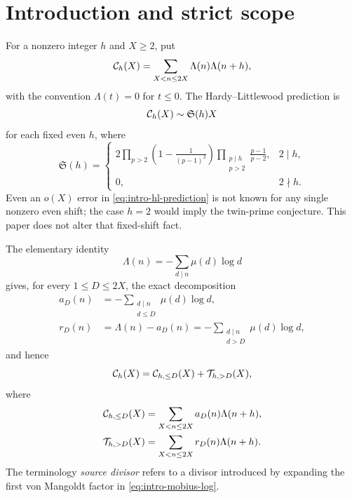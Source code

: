 \section{Introduction and strict scope}
\label{sec:introduction-scope}

For a nonzero integer $h$ and $X\ge2$, put
\begin{equation}\label{eq:intro-pair-correlation}
 \mathcal C_h(X)=\sum_{X<n\le2X}\Lambda(n)\Lambda(n+h),
\end{equation}
with the convention $\Lambda(t)=0$ for $t\le0$.  The Hardy--Littlewood
prediction is
\begin{equation}\label{eq:intro-hl-prediction}
 \mathcal C_h(X)\sim\mathfrak S(h)X
\end{equation}
for each fixed even $h$, where
\begin{equation}\label{eq:intro-singular-series}
 \mathfrak S(h)=
 \begin{cases}
 \displaystyle
 2\prod_{p>2}\left(1-\frac1{(p-1)^2}\right)
 \prod_{\substack{p\mid h\\p>2}}\frac{p-1}{p-2},&2\mid h,\\[1.3ex]
 0,&2\nmid h.
 \end{cases}
\end{equation}
Even an $o(X)$ error in \eqref{eq:intro-hl-prediction} is not known for any
single nonzero even shift; the case $h=2$ would imply the twin-prime
conjecture.  This paper does not alter that fixed-shift fact.

The elementary identity
\begin{equation}\label{eq:intro-mobius-log}
 \Lambda(n)=-\sum_{d\mid n}\mu(d)\log d
\end{equation}
gives, for every $1\le D\le2X$, the exact decomposition
\begin{align}
 a_D(n)&=-\sum_{\substack{d\mid n\\d\le D}}\mu(d)\log d,
 \label{eq:intro-short-weight}\\
 r_D(n)&=\Lambda(n)-a_D(n)
       =-\sum_{\substack{d\mid n\\d>D}}\mu(d)\log d,
 \label{eq:intro-defect-weight}\end{align}
and hence
\begin{equation}\label{eq:intro-exact-split}
 \mathcal C_h(X)=\mathcal C_{h,\le D}(X)+\mathcal T_{h,>D}(X),
\end{equation}
where
\begin{align}
 \mathcal C_{h,\le D}(X)
 &=\sum_{X<n\le2X}a_D(n)\Lambda(n+h),
 \label{eq:intro-short-correlation}\\
 \mathcal T_{h,>D}(X)
 &=\sum_{X<n\le2X}r_D(n)\Lambda(n+h).
 \label{eq:intro-large-defect}
\end{align}
The terminology \emph{source divisor} refers to a divisor introduced by
expanding the first von Mangoldt factor in \eqref{eq:intro-mobius-log}.

